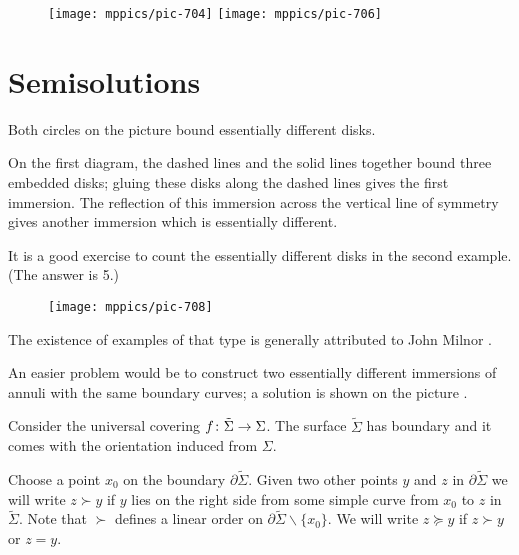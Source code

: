 {

\begin{wrapfigure}{r}{30 mm}
\vskip-4mm
\centering
\texttt{[image: mppics/pic-704]}
\bigskip
\texttt{[image: mppics/pic-706]}
\end{wrapfigure}

\section*{Semisolutions}






Both circles on the picture bound essentially different disks.



\medskip

On the first diagram, the dashed lines and the solid lines together bound three embedded disks;
gluing these disks along the dashed lines gives the first immersion.
The reflection of this immersion across the vertical line of symmetry gives another immersion which is essentially different.
\qeds

}


It is a good exercise to count the essentially different disks in the second example. 
(The answer is 5.) 

{

\begin{wrapfigure}{r}{30 mm}
\vskip-7mm
\centering
\texttt{[image: mppics/pic-708]}
\end{wrapfigure}

The existence of examples of that type is generally attributed to John Milnor \cite{bennequin}.

An easier problem would be to construct two essentially different immersions of annuli with the same boundary curves; a solution is shown on the picture \cite[for more details and references see][]{eppstein-mumford}.

}

Consider the universal covering 
$f\:\tilde\Sigma\z\to\Sigma$.
The surface $\tilde \Sigma$ has boundary and it comes with the orientation induced from $\Sigma$.



Choose a point $x_0$ on the boundary $\partial \tilde \Sigma$.
Given two other points $y$ and $z$ in $\partial \tilde \Sigma$ we will write
$z\succ y$ if $y$ lies on the right side from some simple curve from $x_0$ to $z$ in $\tilde\Sigma$.
Note that  $\succ $ defines a linear order on $\partial\tilde\Sigma\backslash\{x_0\}$.
We will write $z \succeq y$ 
if $z\succ y$ or $z=y$.


